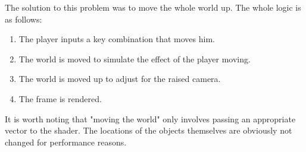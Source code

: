 The solution to this problem was to move the whole world up.
The whole logic is as follows:
\begin{enumerate}
    \item The player inputs a key combination that moves him.
    \item The world is moved to simulate the effect of the player moving.
    \item The world is moved up to adjust for the raised camera.
    \item The frame is rendered.
\end{enumerate}

It is worth noting that "moving the world" only involves passing an appropriate vector to the shader.
The locations of the objects themselves are obviously not changed for performance reasons.